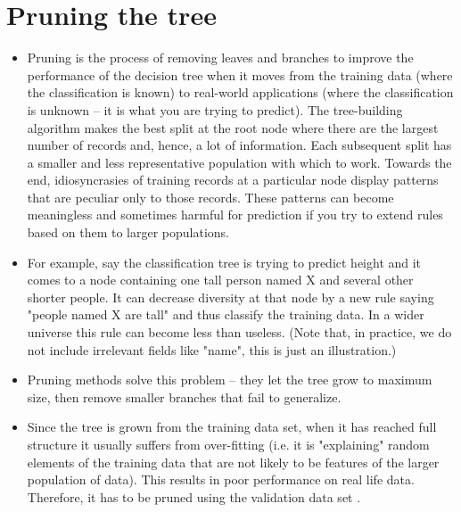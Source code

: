 \documentclass[caret-main.tex]{subfiles}
\begin{document}
\section{Pruning the tree}
\begin{itemize}
\item Pruning is the process of removing leaves and branches to improve the performance of the decision tree when it moves from the training data (where the classification is known) to real-world applications (where the classification is unknown -- it is what you are trying to predict). The tree-building algorithm makes the best split at the root node where there are the largest number of records and, hence, a lot of information. Each subsequent split has a smaller and less representative population with which to work. Towards the end, idiosyncrasies of training records at a particular node display patterns that are peculiar only to those records. These patterns can become meaningless and sometimes harmful for prediction if you try to extend rules based on them to larger populations.

\item For example, say the classification tree is trying to predict height and it comes to a node containing one tall person named X and several other shorter people. It can decrease diversity at that node by a new rule saying "people named X are tall" and thus classify the training data. In a wider universe this rule can become less than useless. (Note that, in practice, we do not include irrelevant fields like "name", this is just an illustration.)

\item Pruning methods solve this problem -- they let the tree grow to maximum size, then remove smaller branches that fail to generalize.

\item Since the tree is grown from the training data set, when it has reached full structure it usually suffers from over-fitting (i.e. it is "explaining" random elements of the training data that are not likely to be features of the larger population of data). This results in poor performance on real life data. Therefore, it has to be pruned using the validation data set .
\end{itemize}
\end{document}
